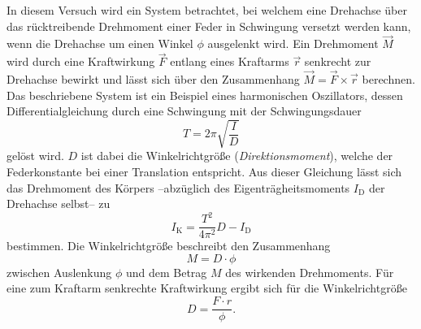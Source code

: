 In diesem Versuch wird ein System betrachtet, bei welchem eine Drehachse über das rücktreibende Drehmoment einer Feder in Schwingung versetzt werden kann, wenn die Drehachse
um einen Winkel $\phi$ ausgelenkt wird. Ein Drehmoment $\vec{M}$ wird durch eine Kraftwirkung $\vec{F}$ entlang eines Kraftarms $\vec{r}$ senkrecht zur Drehachse bewirkt und 
lässt sich über den Zusammenhang $\vec{M} = \vec{F} \times \vec{r}$ berechnen.
Das beschriebene System ist ein Beispiel eines harmonischen Oszillators, dessen Differentialgleichung durch eine Schwingung mit der Schwingungsdauer 
\begin{equation}
    \label{eqn:Schwingungsdauer}
    T = 2\pi \sqrt{\frac{I}{D}}
\end{equation}
gelöst wird. $D$ ist dabei die Winkelrichtgröße (\textit{Direktionsmoment}), welche der Federkonstante bei einer Translation entspricht. Aus dieser Gleichung lässt sich das 
Drehmoment des Körpers --abzüglich des Eigenträgheitsmoments $I_\text{D}$ der Drehachse selbst-- zu
\begin{equation}
    \label{eqn:I_K}
    I_\text{K} = \frac{T^2}{4\pi^2}D - I_\text{D}
\end{equation}
bestimmen.
Die Winkelrichtgröße beschreibt den Zusammenhang 
\begin{equation*}
    M = D \cdot \phi
\end{equation*}
zwischen Auslenkung $\phi$ und dem Betrag $M$ des wirkenden Drehmoments. Für eine zum Kraftarm senkrechte Kraftwirkung ergibt sich für die Winkelrichtgröße
\begin{equation}
    \label{eqn:Winkelrichtgröße}
    D = \frac{F \cdot r}{\phi}.
\end{equation}
